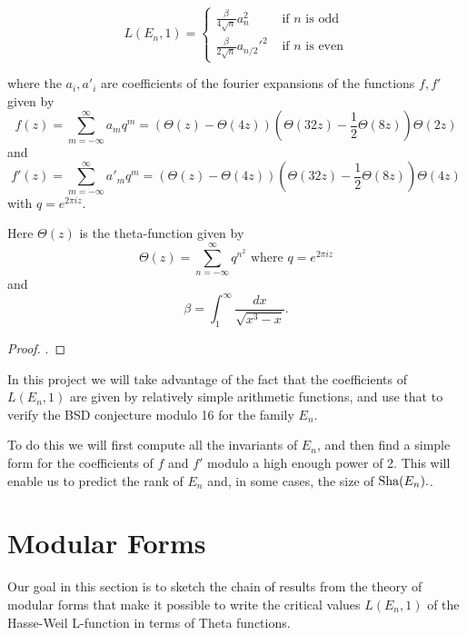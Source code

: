 \documentclass[12pt, a4paper]{report}
\begin{document}
\begin{thm}
  \begin{equation} \label{eq:tunnell}
    L(E_n,1) = \begin{cases}
      \frac{\beta}{4\sqrt{n}}a_n^2 & \text{ if $n$ is odd} \\
      \frac{\beta}{2\sqrt{n}}a_{n/2}'^2 & \text{ if $n$ is even}
    \end{cases}
  \end{equation}

  where the $a_i, a'_i$ are coefficients of the fourier expansions of the
  functions $f, f'$ given by
  \begin{equation} \label{eq:mododd}
    f(z) = \sum\limits_{m=-\infty}^\infty a_m q^m
    = (\Theta(z) - \Theta(4z)) \left(\Theta(32z)-\frac{1}{2} \Theta(8z)\right) \Theta(2z)
  \end{equation}
  and
  \begin{equation} \label{eq:modeven}
    f'(z) = \sum\limits_{m=-\infty}^\infty a'_m q^m =
    (\Theta(z) - \Theta(4z)) \left(\Theta(32z)-\frac{1}{2} \Theta(8z)\right) \Theta(4z)
  \end{equation}
  with $q = e^{2\pi i z}$.
  
  Here $\Theta(z)$ is the theta-function given by
  \[ \Theta(z) = \sum\limits_{n = -\infty}^{\infty} q^{n^2} \text{ where } q =
    e^{2\pi iz}\]
  and
  \[\beta = \int_1^\infty \frac{dx}{\sqrt{x^3-x}}.\]
\end{thm}

\begin{proof}
  \cite[See][pages 325-328]{Tunnell}. 
\end{proof}
  
In this project we will take advantage of the fact that the coefficients of
$L(E_n,1)$ are given by relatively simple arithmetic functions, and use that
to verify the BSD conjecture modulo 16 for the family $E_n$.

To do this we will first compute all the invariants of $E_n$,
and then find a simple form for the coefficients of $f$ and $f'$ modulo
a high enough power of 2. This will enable us to predict the rank of $E_n$ and,
in some cases, the size of $\text{\normalfont Sha}(E_n).$.

\newpage

\chapter{Modular Forms}

Our goal in this section is to sketch the chain of results from the theory of
modular forms that make it possible to write the
critical values $L(E_n,1)$ of the Hasse-Weil L-function in terms of Theta functions. 
\end{document}
